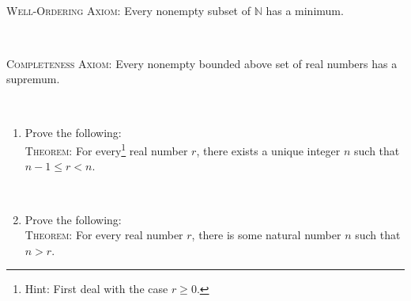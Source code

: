 \documentclass[12pt]{amsart}
\newcommand{\N}{\mathbb{N}}
\begin{document}
\

\newpage


\begin{framed}

\noindent \textsc{Well-Ordering Axiom:} Every nonempty subset of $\N$ has a minimum.

\

\noindent \textsc{Completeness Axiom:} Every nonempty bounded above set of real numbers has a supremum.
\end{framed}


\

\begin{enumerate}



\item Prove the following:\\
\textsc{Theorem:} For every\footnote{Hint: First deal with the case $r\geq 0$.} real number $r$, there exists a unique integer $n$ such that $n-1\leq r < n$.



\


\item Prove the following: \\
\textsc{Theorem:} For every real number $r$, there is some natural number $n$ such that $n>r$.
\end{enumerate}
\end{document}
